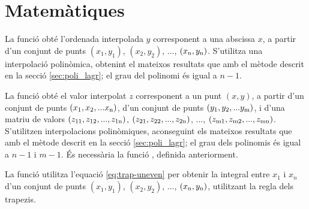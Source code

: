 


\section{Matemàtiques}

La funció  obté l'ordenada interpolada $y$ corresponent a una abscissa $x$, a partir d'un conjunt  de punts $(x_1,y_1)$, $(x_2,y_2)$, ..., $(x_\mathrm{n},y_\mathrm{n})$. S'utilitza una interpolació polinòmica, obtenint el mateixos resultats que amb el mètode descrit en la secció \vref{sec:poli_lagr}; el grau del polinomi és igual a $n-1$.




La funció  obté el valor interpolat $z$ corresponent a un punt $(x, y)$, a partir d'un conjunt de punts $(x_\mathrm{1}, x_\mathrm{2}, ... x_\mathrm{n})$, d'un conjunt de punts $(y_\mathrm{1}, y_\mathrm{2}, ... y_\mathrm{m})$, i d'una matriu de valors $(z_\mathrm{11}, z_\mathrm{12}, ..., z_\mathrm{1n})$,
$(z_\mathrm{21}, z_\mathrm{22}, ..., z_\mathrm{2n})$, ..., $(z_\mathrm{m1}, z_\mathrm{m2}, ..., z_\mathrm{mn})$. S'utilitzen  interpolacions polinòmiques, aconseguint els mateixos resultats que amb el mètode descrit en la secció \vref{sec:poli_lagr}; el grau dels polinomis és igual a $n-1$ i $m-1$.
És necessària la funció , definida anteriorment.




La funció  utilitza l'equació  \eqref{eq:trap-uneven} per obtenir la integral entre $x_1$ i $x_n$ d'un conjunt  de punts $(x_1,y_1)$, $(x_2,y_2)$, ..., $(x_\mathrm{n},y_\mathrm{n})$, utilitzant la regla dels trapezis.


